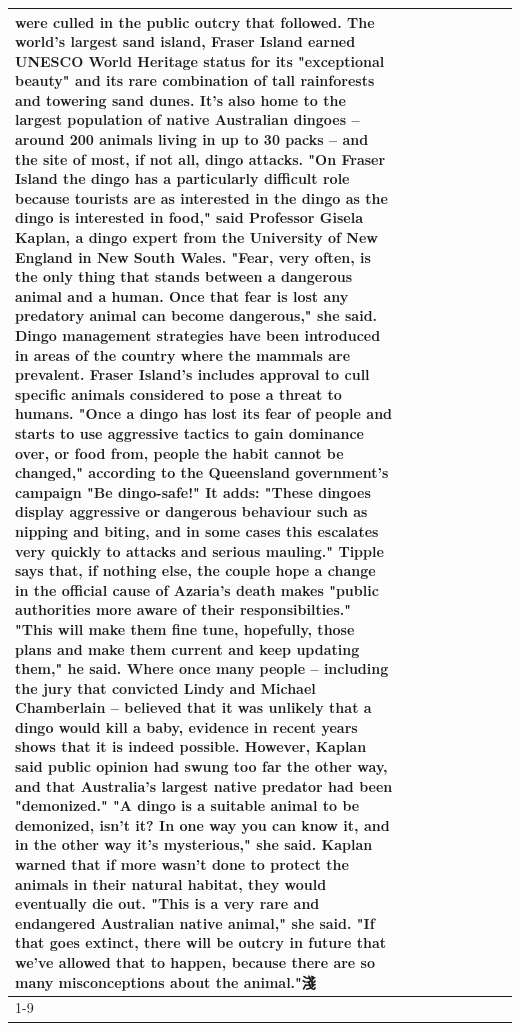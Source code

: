\begin{table}[H]
\begin{tabular}{lllrlllll}
were culled in the public outcry that followed. The world's largest sand island, Fraser Island earned UNESCO World Heritage status for its "exceptional beauty" and its rare combination of tall rainforests and towering sand dunes. It's also home to the largest population of native Australian dingoes -- around 200 animals living in up to 30 packs -- and the site of most, if not all, dingo attacks. "On Fraser Island the dingo has a particularly difficult role because tourists are as interested in the dingo as the dingo is interested in food," said Professor Gisela Kaplan, a dingo expert from the University of New England in New South Wales. "Fear, very often, is the only thing that stands between a dangerous animal and a human. Once that fear is lost any predatory animal can become dangerous," she said. Dingo management strategies have been introduced in areas of the country where the mammals are prevalent. Fraser Island's includes approval to cull specific animals considered to pose a threat to humans. "Once a dingo has lost its fear of people and starts to use aggressive tactics to gain dominance over, or food from, people the habit cannot be changed," according to the Queensland government's campaign "Be dingo-safe!" It adds: "These dingoes display aggressive or dangerous behaviour such as nipping and biting, and in some cases this escalates very quickly to attacks and serious mauling." Tipple says that, if nothing else, the couple hope a change in the official cause of Azaria's death makes "public authorities more aware of their responsibilties." "This will make them fine tune, hopefully, those plans and make them current and keep updating them," he said. Where once many people -- including the jury that convicted Lindy and Michael Chamberlain -- believed that it was unlikely that a dingo would kill a baby, evidence in recent years shows that it is indeed possible. However, Kaplan said public opinion had swung too far the other way, and that Australia's largest native predator had been "demonized." "A dingo is a suitable animal to be demonized, isn't it? In one way you can know it, and in the other way it's mysterious," she said. Kaplan warned that if more wasn't done to protect the animals in their natural habitat, they would eventually die out. "This is a very rare and endangered Australian native animal," she said. "If that goes extinct, there will be outcry in future that we've allowed that to happen, because there are so many misconceptions about the animal."淺 \\
\cline{1-9}

\end{tabular}
\end{table}
